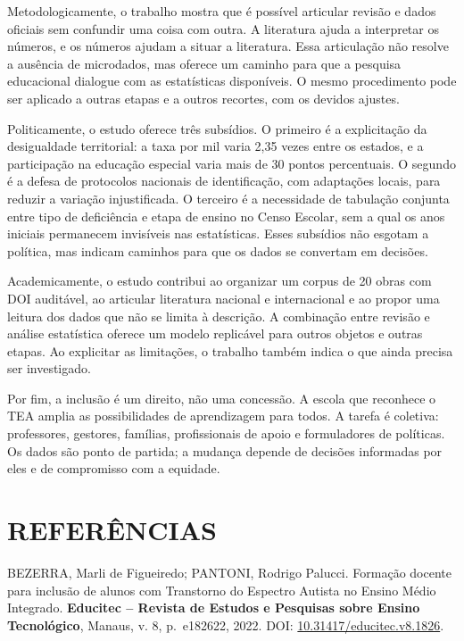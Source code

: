 Metodologicamente, o trabalho mostra que é possível articular revisão e
dados oficiais sem confundir uma coisa com outra. A literatura ajuda a
interpretar os números, e os números ajudam a situar a literatura. Essa
articulação não resolve a ausência de microdados, mas oferece um caminho
para que a pesquisa educacional dialogue com as estatísticas
disponíveis. O mesmo procedimento pode ser aplicado a outras etapas e a
outros recortes, com os devidos ajustes.

Politicamente, o estudo oferece três subsídios. O primeiro é a
explicitação da desigualdade territorial: a taxa por mil varia 2,35
vezes entre os estados, e a participação na educação especial varia mais
de 30 pontos percentuais. O segundo é a defesa de protocolos nacionais
de identificação, com adaptações locais, para reduzir a variação
injustificada. O terceiro é a necessidade de tabulação conjunta entre
tipo de deficiência e etapa de ensino no Censo Escolar, sem a qual os
anos iniciais permanecem invisíveis nas estatísticas. Esses subsídios
não esgotam a política, mas indicam caminhos para que os dados se
convertam em decisões.

Academicamente, o estudo contribui ao organizar um corpus de 20 obras
com DOI auditável, ao articular literatura nacional e internacional e ao
propor uma leitura dos dados que não se limita à descrição. A combinação
entre revisão e análise estatística oferece um modelo replicável para
outros objetos e outras etapas. Ao explicitar as limitações, o trabalho
também indica o que ainda precisa ser investigado.

Por fim, a inclusão é um direito, não uma concessão. A escola que
reconhece o TEA amplia as possibilidades de aprendizagem para todos. A
tarefa é coletiva: professores, gestores, famílias, profissionais de
apoio e formuladores de políticas. Os dados são ponto de partida; a
mudança depende de decisões informadas por eles e de compromisso com a
equidade.

\begingroup
{}

\section*{REFERÊNCIAS}\label{referuxeancias}

BEZERRA, Marli de Figueiredo; PANTONI, Rodrigo Palucci. Formação docente
para inclusão de alunos com Transtorno do Espectro Autista no Ensino
Médio Integrado. \textbf{Educitec -- Revista de Estudos e Pesquisas
sobre Ensino Tecnológico}, Manaus, v. 8, p.~e182622, 2022. DOI:
\url{10.31417/educitec.v8.1826}.

